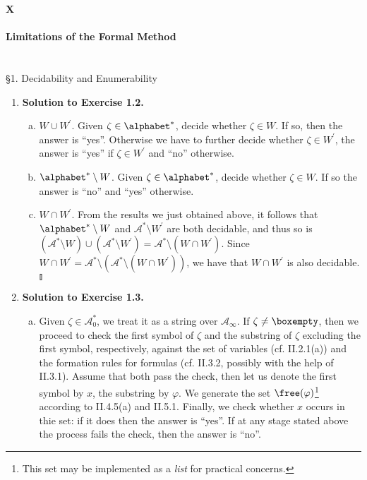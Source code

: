 {\LARGE \bfseries X \\ \\ Limitations of the Formal Method}
\\
\\
\\
{\large \S1. Decidability and Enumerability}
\begin{enumerate}[1.]
\item \textbf{Solution to Exercise 1.2.}
\begin{enumerate}[(a)]
\item $W \cup W^\prime$. Given $\zeta \in \alphabet^\ast$, decide whether $\zeta \in W$. If so, then the answer is ``yes''. Otherwise we have to further decide whether $\zeta \in W^\prime$, the answer is ``yes'' if $\zeta \in W^\prime$ and ``no'' otherwise.
\item $\alphabet^\ast \setminus W$. Given $\zeta \in \alphabet^\ast$, decide whether $\zeta \in W$. If so the answer is ``no'' and ``yes'' otherwise.
\item $W \cap W^\prime$. From the results we just obtained above, it follows that $\alphabet^\ast \setminus W$ and $\mathcal{A}^\ast \setminus W^\prime$ are both decidable, and thus so is $(\mathcal{A}^\ast \setminus W) \cup (\mathcal{A}^\ast \setminus W^\prime) = \mathcal{A}^\ast \setminus (W \cap W^\prime)$. Since $W \cap W^\prime = \mathcal{A}^\ast \setminus (\mathcal{A}^\ast \setminus (W \cap W^\prime))$, we have that $W \cap W^\prime$ is also decidable.\nolinebreak\hfill$\talloblong$
\end{enumerate}
%
\item \textbf{Solution to Exercise 1.3.}
\begin{enumerate}[(a)]
\item Given $\zeta \in \mathcal{A}_0^\ast$, we treat it as a string over $\mathcal{A}_\infty$. If $\zeta \neq \boxempty$, then we proceed to check the first symbol of $\zeta$ and the substring of $\zeta$ excluding the first symbol, respectively, against the set of variables (cf. II.2.1(a)) and the formation rules for formulas (cf. II.3.2, possibly with the help of II.3.1). Assume that both pass the check, then let us denote the first symbol by $x$, the substring by $\varphi$. We generate the set $\free (\varphi)$\footnote{This set may be implemented as a \emph{list} for practical concerns.} according to II.4.5(a) and II.5.1. Finally, we check whether $x$ occurs in thie set: if it does then the answer is ``yes''. If at any stage stated above the process fails the check, then the answer is ``no''.

\end{enumerate}
\end{enumerate}
